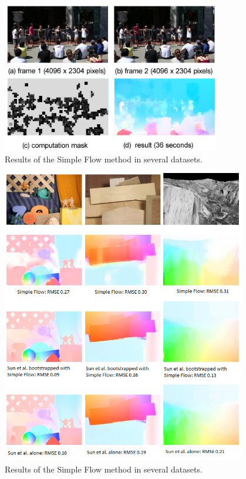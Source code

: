    \begin{figure}[tbhp]
      \centering
      \includegraphics[width=0.85\textwidth]{../images/simpleflow.png}
      \caption{  Results of the Simple Flow method in several datasets. }
      \label{simple_of}
   \end{figure}

   \begin{figure}[tbhp]
      \centering
      \includegraphics[width=0.95\textwidth]{../images/simpleoptflow.png}
      \caption{  Results of the Simple Flow method in several datasets. }
      \label{simple_of}
   \end{figure}


